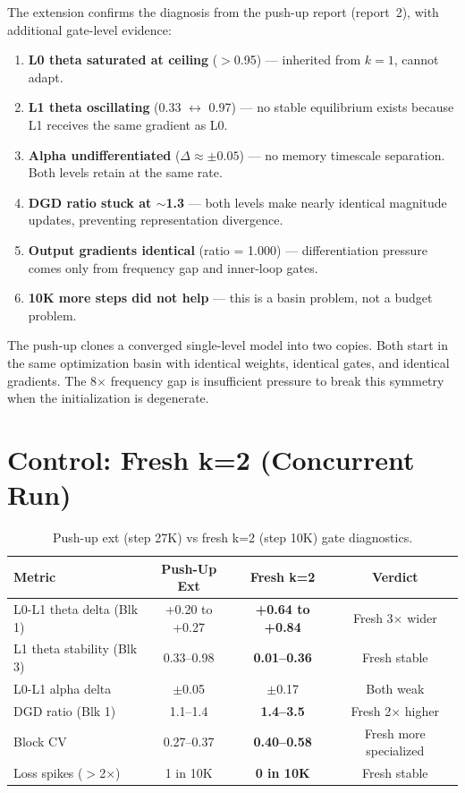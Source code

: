 \documentclass[11pt,a4paper]{article}
\begin{document}
The extension confirms the diagnosis from the push-up report (report~2), with additional
gate-level evidence:

\begin{enumerate}[topsep=4pt, itemsep=2pt]
    \item \textbf{L0 theta saturated at ceiling} ($>$0.95) --- inherited from $k{=}1$, cannot adapt.
    \item \textbf{L1 theta oscillating} (0.33 $\leftrightarrow$ 0.97) --- no stable equilibrium
    exists because L1 receives the same gradient as L0.
    \item \textbf{Alpha undifferentiated} ($\Delta \approx \pm 0.05$) --- no memory timescale
    separation. Both levels retain at the same rate.
    \item \textbf{DGD ratio stuck at $\sim$1.3} --- both levels make nearly identical magnitude
    updates, preventing representation divergence.
    \item \textbf{Output gradients identical} (ratio = 1.000) --- differentiation pressure comes
    only from frequency gap and inner-loop gates.
    \item \textbf{10K more steps did not help} --- this is a basin problem, not a budget problem.
\end{enumerate}

\noindent The push-up clones a converged single-level model into two copies. Both start
in the same optimization basin with identical weights, identical gates, and identical gradients.
The 8$\times$ frequency gap is insufficient pressure to break this symmetry when the
initialization is degenerate.


\section{Control: Fresh k=2 (Concurrent Run)}

\begin{table}[H]
\centering
\caption{Push-up ext (step 27K) vs fresh k=2 (step 10K) gate diagnostics.}
\label{tab:comparison}
\begin{tabular}{@{}lccc@{}}
\toprule
\textbf{Metric} & \textbf{Push-Up Ext} & \textbf{Fresh k=2} & \textbf{Verdict} \\
\midrule
L0-L1 theta delta (Blk 1) & +0.20 to +0.27 & \textcolor{nlgreen}{\textbf{+0.64 to +0.84}} & Fresh 3$\times$ wider \\
L1 theta stability (Blk 3) & 0.33--0.98 & \textcolor{nlgreen}{\textbf{0.01--0.36}} & Fresh stable \\
L0-L1 alpha delta & $\pm$0.05 & $\pm$0.17 & Both weak \\
DGD ratio (Blk 1) & 1.1--1.4 & \textcolor{nlgreen}{\textbf{1.4--3.5}} & Fresh 2$\times$ higher \\
Block CV & 0.27--0.37 & \textcolor{nlgreen}{\textbf{0.40--0.58}} & Fresh more specialized \\
Loss spikes ($>$2$\times$) & 1 in 10K & \textcolor{nlgreen}{\textbf{0 in 10K}} & Fresh stable \\
\bottomrule
\end{tabular}
\end{table}
\end{document}
